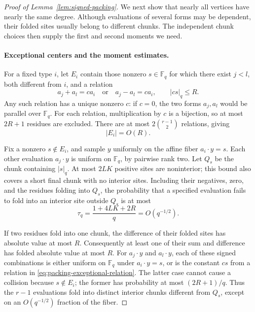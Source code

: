 \begin{proof}[Proof of Lemma~\ref{lem:signed-packing}]
We next show that nearly all vertices have nearly the same degree.
Although evaluations of several forms may be dependent, their folded
sites usually belong to different chunks.  The independent chunk
choices then supply the first and second moments we need.

\paragraph{Exceptional centers and the moment estimates.}
For a fixed type $i$, let $E_i$ contain those nonzero $s\in\mathbb F_q$
for which there exist $j<l$, both different from $i$, and a relation
\begin{equation}
 a_j+a_l=c a_i\quad\text{or}\quad a_j-a_l=c a_i,
 \qquad |cs|_q\le R.
 \label{eq:packing-exceptional-relation}
\end{equation}
Any such relation has a unique nonzero $c$: if $c=0$, the two forms
$a_j,a_l$ would be parallel over $\mathbb F_q$.  For each relation,
multiplication by $c$ is a bijection, so at most $2R+1$ residues are
excluded.  There are at most $2\binom{r-1}{2}$ relations, giving
\begin{equation}
 |E_i|=O(R).
 \label{eq:packing-exception-count}
\end{equation}

Fix a nonzero $s\notin E_i$, and sample $y$ uniformly on the affine fiber
$a_i\cdot y=s$.  Each other evaluation $a_j\cdot y$ is uniform on
$\mathbb F_q$, by pairwise rank two.  Let $Q_s$ be the chunk containing
$|s|_q$.  At most $2LK$ positive sites are noninterior; this bound also
covers a short final chunk with no interior sites.  Including their
negatives, zero, and the residues folding into $Q_s$, the probability
that a specified evaluation fails to fold into an interior site outside
$Q_s$ is at most
\[
 \tau_q=\frac{1+4LK+2R}{q}=O(q^{-1/2}).
\]

If two residues fold into one chunk, the difference of their folded
sites has absolute value at most $R$.  Consequently at least one of
their sum and difference has folded absolute value at most $R$.
For $a_j\cdot y$ and $a_l\cdot y$, each of these signed combinations
is either uniform on $\mathbb F_q$ under $a_i\cdot y=s$, or is the
constant $cs$ from a relation in
\eqref{eq:packing-exceptional-relation}.  The latter case cannot cause
a collision because $s\notin E_i$; the former has probability at most
$(2R+1)/q$.  Thus the $r-1$ evaluations fold into distinct interior
chunks different from $Q_s$, except on an $O(q^{-1/2})$ fraction of
the fiber.


\end{proof}
